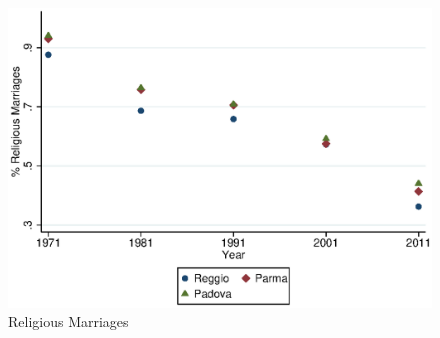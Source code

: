     \begin{figure}[H]
    \centering
    \caption{Religious Marriages}
    \includegraphics[width=\textwidth]{../../output/rel_mar.eps}
	\end{figure}
	
